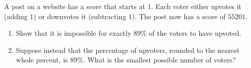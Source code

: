 A post on a website has a score that starts at $1$. Each voter either upvotes it (adding $1$) or downvotes it (subtracting $1$). The post now has a score of $55201$.
\begin{enumerate}
\item[(a)] Show that it is impossible for exactly $89\%$ of the voters to have upvoted.
\item[(b)] Suppose instead that the percentage of upvoters, rounded to the nearest whole percent, is $89\%$. What is the smallest possible number of voters?
\end{enumerate}
